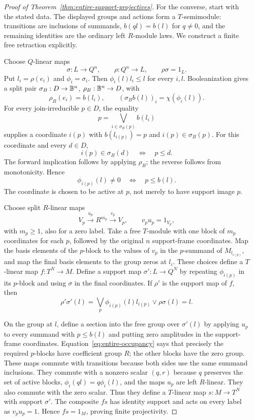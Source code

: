 \begin{proof}[Proof of Theorem~\ref{thm:entire-support-projectives}]
For the converse, start with the stated data. The displayed groups and
actions form a $T$-semimodule: transitions are inclusions of summands,
$b(ql)=b(l)$ for $q\ne0$, and the remaining identities are the
ordinary left $R$-module laws. We construct a finite free retraction
explicitly.

Choose $Q$-linear maps
\[
 \sigma:L\longrightarrow Q^n,\qquad
 \rho:Q^n\longrightarrow L,\qquad \rho\sigma=1_L.
\]
Put $l_i=\rho(e_i)$ and $\phi_i=\sigma_i$. Then
$\phi_i(l)l_i\le l$ for every $i,l$. Booleanization gives a split
pair $\sigma_B:D\to\mathbb B^n$, $\rho_B:\mathbb B^n\to D$, with
\[
 \rho_B(e_i)=b(l_i),\qquad
 (\sigma_Bb(l))_i=\chi(\phi_i(l)).
\]
For every join-irreducible $p\in D$, the equality
\[
 p=\bigvee_{i\in\sigma_B(p)}b(l_i)
\]
supplies a coordinate $i(p)$ with $b(l_{i(p)})=p$ and
$i(p)\in\sigma_B(p)$. For this coordinate and every $d\in D$,
\[
 i(p)\in\sigma_B(d)\quad\Longleftrightarrow\quad p\le d.
\]
The forward implication follows by applying $\rho_B$; the reverse
follows from monotonicity. Hence
\begin{equation}\label{eq:entire-occupancy}
 \phi_{i(p)}(l)\ne0\quad\Longleftrightarrow\quad p\le b(l).
\end{equation}
The coordinate is chosen to be active at $p$, not merely to have
support image $p$.

Choose split $R$-linear maps
\[
 V_p\xrightarrow{u_p}R^{m_p}\xrightarrow{v_p}V_p,\qquad
 v_pu_p=1_{V_p},
\]
with $m_p\ge1$, also for a zero label. Take a free $T$-module with
one block of $m_p$ coordinates for each $p$, followed by the original
$n$ support-frame coordinates. Map the basis elements of the
$p$-block to the values of $v_p$ in the $p$-summand of
$M_{l_{i(p)}}$, and map the final basis elements to the group zeros
at $l_i$. These choices define a $T$-linear map $f:T^N\to M$.
Define a support map $\sigma':L\to Q^N$ by repeating
$\phi_{i(p)}$ in its $p$-block and using $\sigma$ in the final
coordinates. If $\rho'$ is the support map of $f$, then
\[
 \rho'\sigma'(l)=
 \bigvee_p\phi_{i(p)}(l)l_{i(p)}\vee\rho\sigma(l)=l.
\]

On the group at $l$, define a section into the free group over
$\sigma'(l)$ by applying $u_p$ to every summand with $p\le b(l)$
and putting zero amplitudes in the support-frame coordinates.
Equation~\eqref{eq:entire-occupancy} says that precisely the required
$p$-blocks have coefficient group $R$; the other blocks have the
zero group. These maps commute with transitions because both sides
use the same summand inclusions. They commute with a nonzero scalar
$(q,r)$ because $q$ preserves the set of active blocks,
$\phi_i(ql)=q\phi_i(l)$, and the maps $u_p$ are left $R$-linear.
They also commute with the zero scalar. Thus they define a
$T$-linear map $s:M\to T^N$ with support $\sigma'$. The composite
$fs$ has identity support and acts on every label as $v_pu_p=1$.
Hence $fs=1_M$, proving finite projectivity.


\end{proof}

